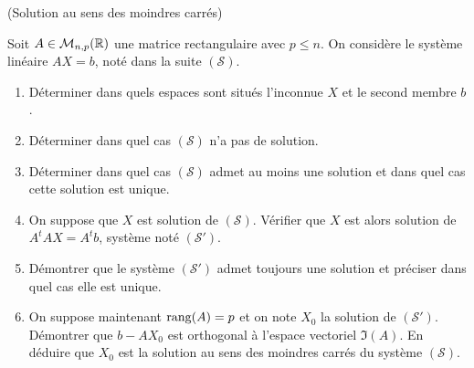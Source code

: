 \documentclass[a4paper,12pt,reqno]{amsart}
\begin{document}
\begin{exo} (Solution au sens des moindres carrés)

    Soit $A\in {\mathcal M}_{n,p}(\mathbb{R})$ une matrice rectangulaire avec $p \leq n$. On considère le système linéaire $AX=b$, noté dans la suite $({\mathcal S})$.
    \begin{enumerate}
        \item Déterminer dans quels espaces sont situés l'inconnue $X$ et le second membre $b$.

        \item Déterminer dans quel cas $({\mathcal S})$ n'a pas de solution.

        \item Déterminer dans quel cas $({\mathcal S})$ admet au moins une solution et dans quel cas cette solution est unique.

        \item On suppose que $X$ est solution de $({\mathcal S})$. Vérifier que $X$ est alors solution de $A^tAX=A^tb$, système noté $({\mathcal S}')$.

        \item Démontrer que le système $({\mathcal S}')$ admet toujours une solution et préciser dans quel cas elle est unique.

        \item On suppose maintenant ${\rm rang}(A)=p$ et on note $X_0$ la solution de $({\mathcal S}')$. Démontrer que $b-AX_0$ est orthogonal à l'espace vectoriel $\Im(A)$. En déduire que $X_0$ est la solution au sens des moindres carrés du système $({\mathcal S})$.
    \end{enumerate}
\end{exo}
\end{document}
